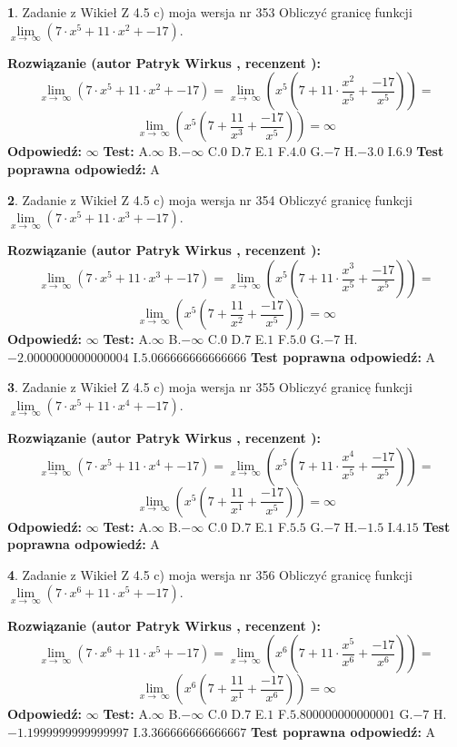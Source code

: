 \documentclass[12pt, a4paper]{article}
\theoremstyle{definition} %
\newtheorem{zad}{}
\newcommand{\zadStart}[1]{\begin{zad}#1\newline}
\newcommand{\zadStop}{\end{zad}}
\newcommand{\rozwStart}[2]{\noindent \textbf{Rozwiązanie (autor #1 , recenzent #2): }\newline}
\newcommand{\rozwStop}{\newline}
\newcommand{\odpStart}{\noindent \textbf{Odpowiedź:}\newline}
\newcommand{\odpStop}{\newline}
\newcommand{\testStart}{\noindent \textbf{Test:}\newline}
\newcommand{\testStop}{\newline}
\newcommand{\kluczStart}{\noindent \textbf{Test poprawna odpowiedź:}\newline}
\newcommand{\kluczStop}{\newline}
\begin{document}
\zadStart{Zadanie z Wikieł Z 4.5 c) moja wersja nr 353}
Obliczyć granicę funkcji  $\lim\limits_{x\to\ \infty}(7 \cdot x^{5}+11 \cdot x^{2}+-17)$.
\zadStop
\rozwStart{Patryk Wirkus}{}
$$\lim\limits_{x\to\ \infty}(7 \cdot x^{5}+11 \cdot x^{2}+-17) = \lim\limits_{x\to\ \infty}(x^{5}(7 +11 \cdot \frac{x^{2}}{x^{5}}+\frac{-17}{x^{5}})) =$$ $$\lim\limits_{x\to\ \infty}(x^{5}(7 +\frac{11}{x^{3}}+\frac{-17}{x^{5}})) =\infty$$
\rozwStop
\odpStart
$\infty$
\odpStop
\testStart
A.$\infty$ B.$-\infty$ C.$0$ D.$7$ E.$1$
F.$4.0$ G.$-7$
H.$-3.0$
I.$6.9$
\testStop
\kluczStart
A
\kluczStop



\zadStart{Zadanie z Wikieł Z 4.5 c) moja wersja nr 354}
Obliczyć granicę funkcji  $\lim\limits_{x\to\ \infty}(7 \cdot x^{5}+11 \cdot x^{3}+-17)$.
\zadStop
\rozwStart{Patryk Wirkus}{}
$$\lim\limits_{x\to\ \infty}(7 \cdot x^{5}+11 \cdot x^{3}+-17) = \lim\limits_{x\to\ \infty}(x^{5}(7 +11 \cdot \frac{x^{3}}{x^{5}}+\frac{-17}{x^{5}})) =$$ $$\lim\limits_{x\to\ \infty}(x^{5}(7 +\frac{11}{x^{2}}+\frac{-17}{x^{5}})) =\infty$$
\rozwStop
\odpStart
$\infty$
\odpStop
\testStart
A.$\infty$ B.$-\infty$ C.$0$ D.$7$ E.$1$
F.$5.0$ G.$-7$
H.$-2.0000000000000004$
I.$5.066666666666666$
\testStop
\kluczStart
A
\kluczStop



\zadStart{Zadanie z Wikieł Z 4.5 c) moja wersja nr 355}
Obliczyć granicę funkcji  $\lim\limits_{x\to\ \infty}(7 \cdot x^{5}+11 \cdot x^{4}+-17)$.
\zadStop
\rozwStart{Patryk Wirkus}{}
$$\lim\limits_{x\to\ \infty}(7 \cdot x^{5}+11 \cdot x^{4}+-17) = \lim\limits_{x\to\ \infty}(x^{5}(7 +11 \cdot \frac{x^{4}}{x^{5}}+\frac{-17}{x^{5}})) =$$ $$\lim\limits_{x\to\ \infty}(x^{5}(7 +\frac{11}{x^{1}}+\frac{-17}{x^{5}})) =\infty$$
\rozwStop
\odpStart
$\infty$
\odpStop
\testStart
A.$\infty$ B.$-\infty$ C.$0$ D.$7$ E.$1$
F.$5.5$ G.$-7$
H.$-1.5$
I.$4.15$
\testStop
\kluczStart
A
\kluczStop



\zadStart{Zadanie z Wikieł Z 4.5 c) moja wersja nr 356}
Obliczyć granicę funkcji  $\lim\limits_{x\to\ \infty}(7 \cdot x^{6}+11 \cdot x^{5}+-17)$.
\zadStop
\rozwStart{Patryk Wirkus}{}
$$\lim\limits_{x\to\ \infty}(7 \cdot x^{6}+11 \cdot x^{5}+-17) = \lim\limits_{x\to\ \infty}(x^{6}(7 +11 \cdot \frac{x^{5}}{x^{6}}+\frac{-17}{x^{6}})) =$$ $$\lim\limits_{x\to\ \infty}(x^{6}(7 +\frac{11}{x^{1}}+\frac{-17}{x^{6}})) =\infty$$
\rozwStop
\odpStart
$\infty$
\odpStop
\testStart
A.$\infty$ B.$-\infty$ C.$0$ D.$7$ E.$1$
F.$5.800000000000001$ G.$-7$
H.$-1.1999999999999997$
I.$3.366666666666667$
\testStop
\kluczStart
A
\kluczStop
\end{document}
